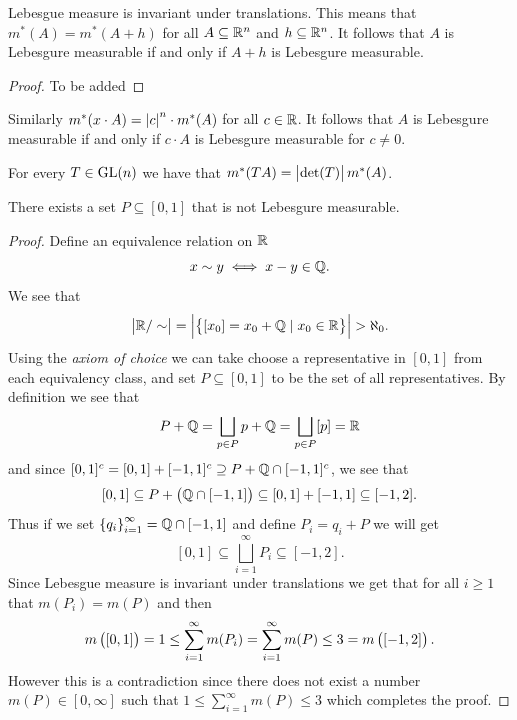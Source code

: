 \documentclass[11pt,a4paper]{article}
\begin{document}
\begin{proposition}
  Lebesgue measure is invariant under translations.
  This means that $m^*(A) = m^*(A + h)$ for all $A \subseteq \mathbb{R}^n$
  and $h \subseteq \mathbb{R}^n$.
  It follows that $A$ is Lebesgure measurable if and only if $A + h$ is
  Lebesgure measurable.
\end{proposition}
\begin{proof}
  To be added
\end{proof}

\begin{proposition}
  Similarly $m^*(x \cdot A) = \left\lvert c\right\rvert^n \cdot m^*(A)$ for all $c \in \mathbb{R}$.
  It follows that $A$ is Lebesgure measurable if and only if $c\cdot A$ is
  Lebesgure measurable for $c \neq 0$.
\end{proposition}

\begin{proposition}
  For every $T \in \mathrm{GL}(n)$ we have that $m^*(TA) = \left\lvert\det(T)\right\rvert m^*(A)$.
\end{proposition}

\begin{proposition}
  There exists a set $P \subseteq [0,1]$ that is not Lebesgure measurable.
\end{proposition}
\begin{proof}
  Define an equivalence relation on $\mathbb{R}$
  \[
    x \sim y \iff x - y \in \mathbb{Q}.
  \]
  We see that
  \[
    \left\lvert\mathbb{R} / \sim\right\rvert = \left\lvert\left\{[x_0] = x_0 + \mathbb{Q} \mid x_0 \in \mathbb{R}\right\}\right\rvert > \aleph_0.
  \]
  Using the \textit{axiom of choice} we can take choose a representative in
  $[0,1]$ from each equivalency class,
  and set $P \subseteq [0,1]$ to be the set of all representatives.
  By definition we see that
  \[
    P + \mathbb{Q} =
    \bigsqcup_{p \in P} p + \mathbb{Q} =
    \bigsqcup_{p \in P} [p] = \mathbb{R}
  \]
  and since $[0,1]^c = [0,1] + [-1,1]^c \supseteq P + \mathbb{Q} \cap [-1,1]^c$,
  we see that
  \[
    [0,1] \subseteq
    P + \del{\Q \cap [-1,1]} \subseteq
    [0,1] + [-1,1] \subseteq
    [-1,2].
  \]
  Thus if we set $\left\{q_i\right\}_{i=1}^{\infty} = \mathbb{Q} \cap [-1,1]$ and define
  $P_i = q_i + P$ we will get
  \[
    [0,1] \subseteq \bigsqcup_{i=1}^{\infty} P_i \subseteq [-1,2].
  \]
  Since Lebesgue measure is invariant under translations we get that
  for all $i \geq 1$ that $m(P_i) = m(P)$ and then
  \[
    m\del{[0,1]} = 1 \le
    \sum_{i=1}^{\infty} m(P_i) =
    \sum_{i=1}^{\infty} m(P) \le
    3 = m\del{[-1,2]}.
  \]
  However this is a contradiction since there does not exist a number
  $m(P) \in [0,\infty]$ such that $1 \le \sum_{i=1}^{\infty} m(P) \le 3$
  which completes the proof.
\end{proof}
\end{document}
